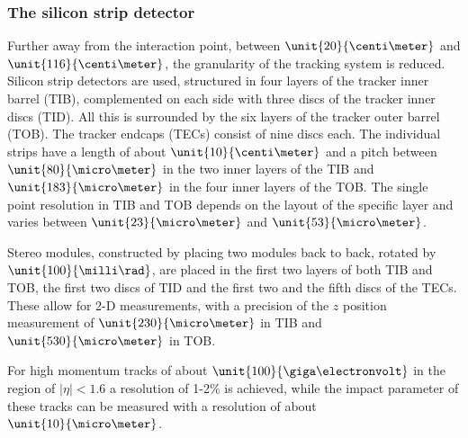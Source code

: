 \subsubsection*{The silicon strip detector}
Further away from the interaction point, between $\unit{20}{\centi\meter}$ and $\unit{116}{\centi\meter}$, the granularity of the tracking system is reduced. Silicon strip detectors are used, structured in four layers of the tracker inner barrel (TIB), complemented on each side with three discs of the tracker inner discs (TID). All this is surrounded by the six layers of the tracker outer barrel (TOB). The tracker endcaps (TECs) consist of nine discs each. The individual strips have a length of about $\unit{10}{\centi\meter}$ and a pitch between $\unit{80}{\micro\meter}$ in the two inner layers of the TIB and $\unit{183}{\micro\meter}$ in the four inner layers of the TOB. The single point resolution in TIB and TOB depends on the layout of the specific layer and varies between $\unit{23}{\micro\meter}$ and $\unit{53}{\micro\meter}$. 

Stereo modules, constructed by placing two modules back to back, rotated by $\unit{100}{\milli\rad}$, are placed in the first two layers of both TIB and TOB, the first two discs of TID and the first two and the fifth discs of the TECs. These allow for 2-D measurements, with a precision of the $z$ position measurement of $\unit{230}{\micro\meter}$ in TIB and $\unit{530}{\micro\meter}$ in TOB. 

For high momentum tracks of about $\unit{100}{\giga\electronvolt}$ in the region of $\vert \eta \vert < 1.6$ a \pt resolution of 1-2\% is achieved, while the impact parameter of these tracks can be measured with a resolution of about $\unit{10}{\micro\meter}$. 

